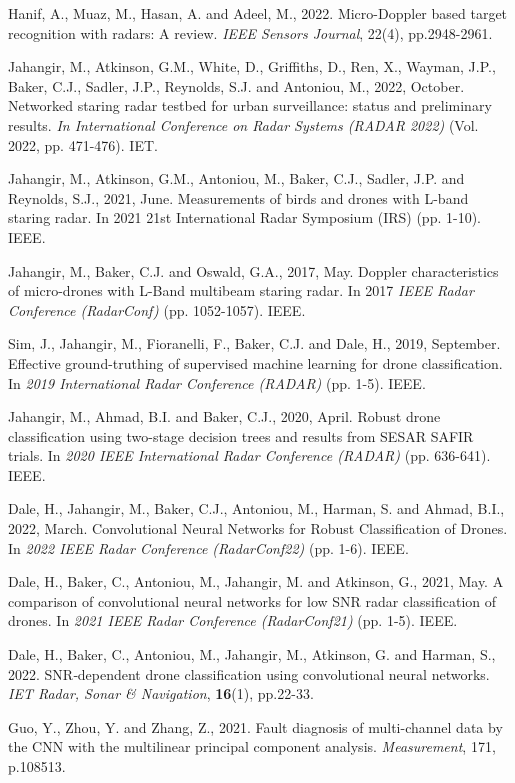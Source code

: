 \documentclass{cta-author}
\begin{document}
\begin{thebibliography}{9}
Hanif, A., Muaz, M., Hasan, A. and Adeel, M., 2022. Micro-Doppler based target recognition with radars: A review. \textit{IEEE Sensors Journal}, 22(4), pp.2948-2961.

Jahangir, M., Atkinson, G.M., White, D., Griffiths, D., Ren, X., Wayman, J.P., Baker, C.J., Sadler, J.P., Reynolds, S.J. and Antoniou, M., 2022, October. Networked staring radar testbed for urban surveillance: status and preliminary results. \textit{In International Conference on Radar Systems (RADAR 2022)} (Vol. 2022, pp. 471-476). IET.

Jahangir, M., Atkinson, G.M., Antoniou, M., Baker, C.J., Sadler, J.P. and Reynolds, S.J., 2021, June. Measurements of birds and drones with L-band staring radar. In 2021 21st International Radar Symposium (IRS) (pp. 1-10). IEEE.

Jahangir, M., Baker, C.J. and Oswald, G.A., 2017, May. Doppler characteristics of micro-drones with L-Band multibeam staring radar. In 2017 \textit{IEEE Radar Conference (RadarConf)} (pp. 1052-1057). IEEE.

Sim, J., Jahangir, M., Fioranelli, F., Baker, C.J. and Dale, H., 2019, September. Effective ground-truthing of supervised machine learning for drone classification. In \textit{2019 International Radar Conference (RADAR)} (pp. 1-5). IEEE.

Jahangir, M., Ahmad, B.I. and Baker, C.J., 2020, April. Robust drone classification using two-stage decision trees and results from SESAR SAFIR trials. In \textit{2020 IEEE International Radar Conference (RADAR)} (pp. 636-641). IEEE.

Dale, H., Jahangir, M., Baker, C.J., Antoniou, M., Harman, S. and Ahmad, B.I., 2022, March. Convolutional Neural Networks for Robust Classification of Drones. In \textit{2022 IEEE Radar Conference (RadarConf22)} (pp. 1-6). IEEE.

Dale, H., Baker, C., Antoniou, M., Jahangir, M. and Atkinson, G., 2021, May. A comparison of convolutional neural networks for low SNR radar classification of drones. In \textit{2021 IEEE Radar Conference (RadarConf21)} (pp. 1-5). IEEE.

Dale, H., Baker, C., Antoniou, M., Jahangir, M., Atkinson, G. and Harman, S., 2022. SNR‐dependent drone classification using convolutional neural networks. \textit{IET Radar, Sonar & Navigation}, \textbf{16}(1), pp.22-33.

Guo, Y., Zhou, Y. and Zhang, Z., 2021. Fault diagnosis of multi-channel data by the CNN with the multilinear principal component analysis. \textit{Measurement}, 171, p.108513.


\end{thebibliography}
\end{document}
